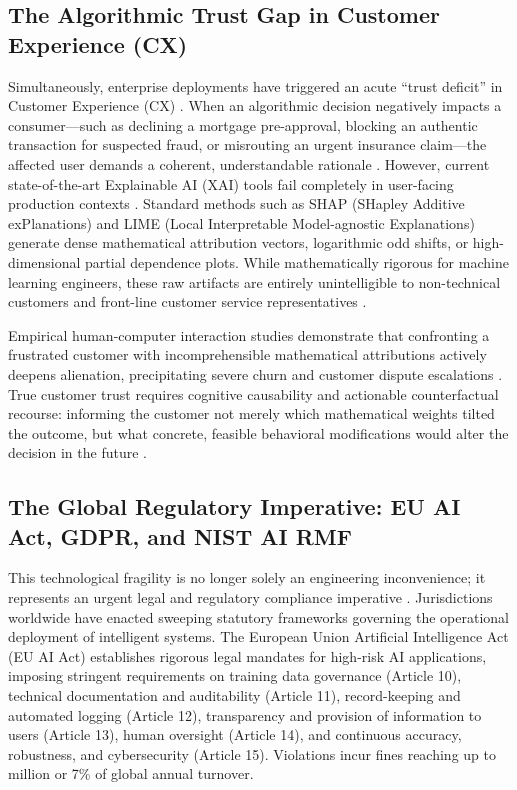 \documentclass[journal]{IEEEtran}
\begin{document}
\subsection{The Algorithmic Trust Gap in Customer Experience (CX)}
Simultaneously, enterprise deployments have triggered an acute ``trust deficit'' in Customer Experience (CX) \cite{liao2020questioning, chi2022user}. When an algorithmic decision negatively impacts a consumer---such as declining a mortgage pre-approval, blocking an authentic transaction for suspected fraud, or misrouting an urgent insurance claim---the affected user demands a coherent, understandable rationale \cite{wachter2017counterfactual, shin2021effects}. However, current state-of-the-art Explainable AI (XAI) tools fail completely in user-facing production contexts \cite{miller2019explanation, kunkel2019let}. Standard methods such as SHAP (SHapley Additive exPlanations) \cite{lundberg2017unified} and LIME (Local Interpretable Model-agnostic Explanations) \cite{ribeiro2016should} generate dense mathematical attribution vectors, logarithmic odd shifts, or high-dimensional partial dependence plots. While mathematically rigorous for machine learning engineers, these raw artifacts are entirely unintelligible to non-technical customers and front-line customer service representatives \cite{wang2019designing, ehsan2021expanding}.

Empirical human-computer interaction studies demonstrate that confronting a frustrated customer with incomprehensible mathematical attributions actively deepens alienation, precipitating severe churn and customer dispute escalations \cite{dzindolet2003role, lee2004trust, jacovi2021formalizing}. True customer trust requires cognitive causability and actionable counterfactual recourse: informing the customer not merely which mathematical weights tilted the outcome, but what concrete, feasible behavioral modifications would alter the decision in the future \cite{mothilal2020explaining, verma2020counterfactual}.

\subsection{The Global Regulatory Imperative: EU AI Act, GDPR, and NIST AI RMF}
This technological fragility is no longer solely an engineering inconvenience; it represents an urgent legal and regulatory compliance imperative \cite{eu_ai_act2024, mittelstadt2019principles}. Jurisdictions worldwide have enacted sweeping statutory frameworks governing the operational deployment of intelligent systems. The European Union Artificial Intelligence Act (EU AI Act) \cite{eu_ai_act2024} establishes rigorous legal mandates for high-risk AI applications, imposing stringent requirements on training data governance (Article 10), technical documentation and auditability (Article 11), record-keeping and automated logging (Article 12), transparency and provision of information to users (Article 13), human oversight (Article 14), and continuous accuracy, robustness, and cybersecurity (Article 15). Violations incur fines reaching up to  million or 7\% of global annual turnover.
\end{document}

